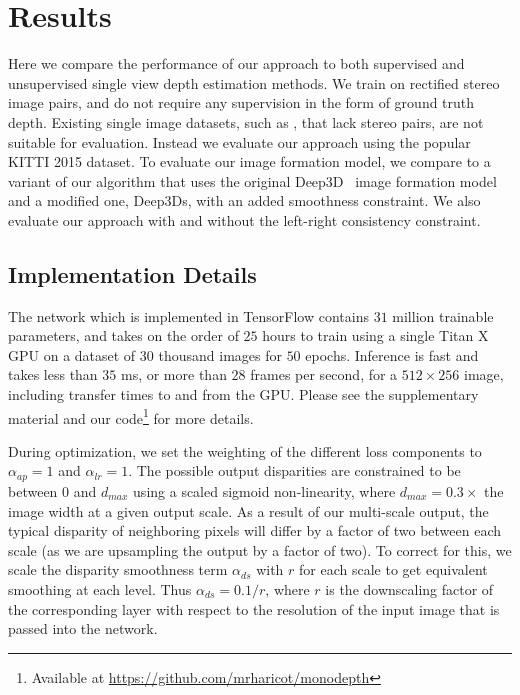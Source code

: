 \documentclass[10pt,twocolumn,letterpaper]{article}
\begin{document}
\section{Results}
Here we compare the performance of our approach to both supervised and unsupervised single view depth estimation methods. 
We train on rectified stereo image pairs, and do not require any supervision in the form of ground truth depth.
Existing single image datasets, such as \cite{Silberman:ECCV12, saxena2009make3d}, that lack stereo pairs, are not suitable for evaluation.
Instead we evaluate our approach using the popular KITTI 2015 \cite{Geiger2012CVPR} dataset.
To evaluate our image formation model, we compare to a variant of our algorithm that uses the original Deep3D~\cite{xie2016deep3d} image formation model and a modified one, Deep3Ds, with an added smoothness constraint. 
We also evaluate our approach with and without the left-right consistency constraint.

\subsection{Implementation Details}
The network which is implemented in TensorFlow \cite{tensorflow} contains $31$ million trainable parameters, and takes on the order of $25$ hours to train using a single Titan X GPU on a dataset of $30$ thousand images for $50$ epochs. 
Inference is fast and takes less than $35$ ms, or more than $28$ frames per second, for a $512\times 256$ image, including transfer times to and from the GPU. Please see the supplementary material and our code\footnote{Available at \url{https://github.com/mrharicot/monodepth}} for more details.

During optimization, we set the weighting of the different loss components to $\alpha_{ap} = 1$ and $\alpha_{lr} = 1$. 
The possible output disparities are constrained to be between $0$ and $d_{max}$ using a scaled sigmoid non-linearity, where $d_{max} = 0.3 \times$ the image width at a given output scale. 
As a result of our multi-scale output, the typical disparity of neighboring pixels will differ by a factor of two between each scale (as we are upsampling the output by a factor of two). 
To correct for this, we scale the disparity smoothness term $\alpha_{ds}$ with $r$ for each scale to get equivalent smoothing at each level. 
Thus $\alpha_{ds} = 0.1 / r $, where $r$ is the downscaling factor of the corresponding layer with respect to the resolution of the input image that is passed into the network.
\end{document}
